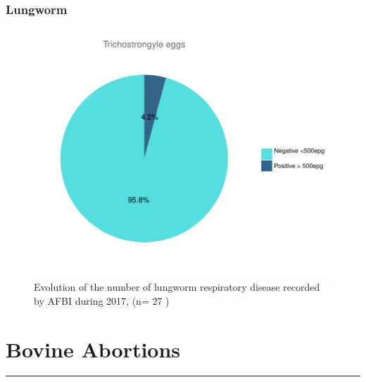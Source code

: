 \documentclass[]{book}
\begin{document}
\subsection{Lungworm}\label{lungworm}

\begin{figure}

{\centering \includegraphics{AFBI_files/figure-latex/unnamed-chunk-53-1} 

}

\caption{Evolution of the number of lungworm  respiratory disease recorded by AFBI during 2017, (n= 27 )}\label{fig:unnamed-chunk-53}
\end{figure}

\chapter{Bovine Abortions}\label{bovine-abortions}

\begin{center}\rule{0.5\linewidth}{\linethickness}\end{center}
\end{document}
